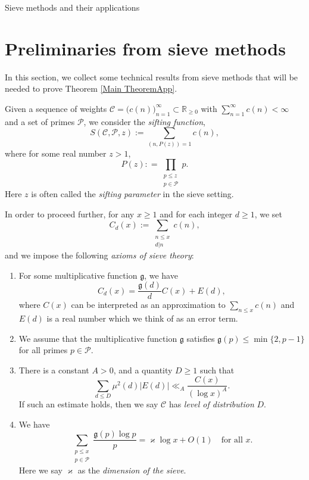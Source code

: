 \documentclass[12pt]{amsart}
\makeatletter
\renewcommand\part{\@startsection{part}{2}%
	\z@{0.5\linespacing\@plus2\linespacing}{\linespacing}%
	{\normalfont\large\scshape\bfseries\centering}}
\numberwithin{equation}{section}
\theoremstyle{remark}
\theoremstyle{definition}
\makeatother
\begin{document}
\part{Sieve methods and their applications}\label{part: sieve}

\section{Preliminaries from sieve methods}\label{prelim: sieve}
In this section, we collect some technical results from sieve methods that will be needed to prove Theorem \ref{Main TheoremApp}. 



Given a sequence of weights $\mathcal{C}=\big(c(n)\big)_{n=1}^\infty \subset \mathbb{R}_{\geq 0}$ with $\sum_{n=1}^\infty c(n) <\infty$ and a set of primes $\mathcal{P}$, we consider the {\it sifting function},
\[S(\mathcal{C},\mathcal{P}, z) := \sum_{(n, P(z))=1}c(n),\]
where for some real number $z>1$,
\[P(z): = \prod_{\substack{p \leq z\\p \in \mathcal{P}}}p.\]
Here $z$ is often called the \emph{sifting parameter} in the sieve setting.


In order to proceed further, for any $x\geq 1$ and for each integer $d\geq 1$, we set 
\[C_d(x) := \sum_{\substack{n \leq x\\d|n}}c(n), \]
and we impose the following {\it axioms of sieve theory}:
\begin{enumerate}[label=(A\arabic*)]
\item \label{A1} For some multiplicative function $\mathfrak{g}$, we have \[C_d(x)= \dfrac{\mathfrak{g}(d)}{d}C(x) + {E}(d),\]
where $C(x)$  can be interpreted as an approximation to $\sum_{n\leq x}c(n)$ and ${E}(d)$ is a real number which we think of as an error term.
\item \label{A2} We assume that the multiplicative function $\mathfrak{g}$ satisfies $\mathfrak{g}(p) \leq \min\{2, p-1\}$ for all primes $p\in \mathcal{P}$.
\item \label{A3} There is a constant $A>0$, and a quantity $D\geq 1$ such that
\[\sum_{d\leq D}\mu^2(d)|{E}(d)| \ll_{A}\dfrac{C(x)}{(\log x)^A}.\]
If such an estimate holds, then we say $\mathcal{C}$ has {\it level of distribution} $D$.
\item \label{A4} We have
\[\sum_{\substack{p \leq x\\ p \in \mathcal{P}}}\dfrac{\mathfrak{g}(p)\log p}{p} = \varkappa\log x + O(1) \quad \text{for all $x$}.\]
Here we say $\varkappa$ as the {\it dimension of the sieve}.
\end{enumerate}
\end{document}
